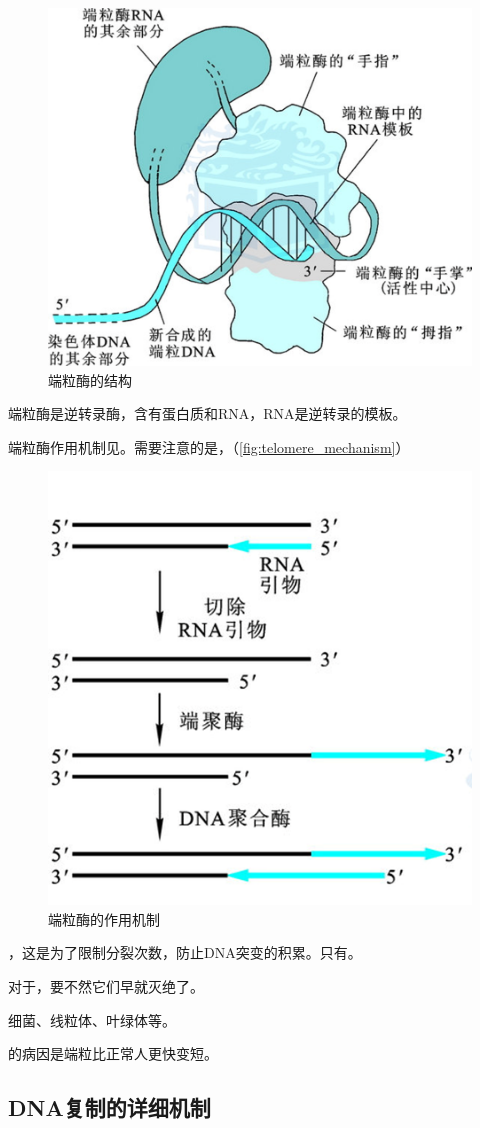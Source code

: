 \begin{figure}[h]
	\centering
	\includegraphics[width=0.5\linewidth]{Pics/端粒酶}
	\caption{端粒酶的结构}
	\label{fig:telomere}
\end{figure}


端粒酶是逆转录酶，含有蛋白质和RNA，RNA是逆转录的模板。

端粒酶作用机制见。需要注意的是，（\autoref{fig:telomere_mechanism}）

\begin{figure}[htbp]
	\centering
	\includegraphics[width=0.4\linewidth]{Pics/端粒酶1}
	\caption{端粒酶的作用机制}
	\label{fig:telomere_mechanism}
\end{figure}

，这是为了限制分裂次数，防止DNA突变的积累。只有。

对于，要不然它们早就灭绝了。

细菌、线粒体、叶绿体等。

的病因是端粒比正常人更快变短。

\subsection{DNA复制的详细机制}

